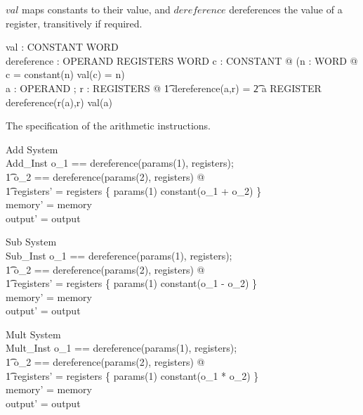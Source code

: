 $val$ maps constants to their value, and $dereference$ dereferences
the value of a register, transitively if required.

\begin{axdef}
    val : CONSTANT \fun WORD\\
    dereference : OPERAND \cross REGISTERS \fun WORD
\where
    \forall c : CONSTANT @ (\exists n : WORD @ c = constant(n) \land val(c) = n)\\
    \forall a : OPERAND ; r : REGISTERS @
	\t1 dereference(a,r) =
	    \t2 \IF a \in REGISTER \THEN dereference(r(a),r) \ELSE val(a)
\end{axdef}

The specification of the arithmetic instructions.

\begin{schema}{Add}
    \Delta System\\
    Add\_Inst
\where
    \LET o_1 == dereference(params(1), registers);\\
	\t1 o_2 == dereference(params(2), registers) @\\
        \t1 registers' = registers \oplus 
	    \{ params(1) \mapsto constant(o_1 + o_2) \}\\
    memory' = memory\\
    output' = output
\end{schema}

\begin{schema}{Sub}
    \Delta System\\
    Sub\_Inst
\where
    \LET o_1 == dereference(params(1), registers);\\
	\t1 o_2 == dereference(params(2), registers) @\\
        \t1 registers' = registers \oplus 
	    \{ params(1) \mapsto constant(o_1 - o_2) \}\\
    memory' = memory\\
    output' = output
\end{schema}

\begin{schema}{Mult}
    \Delta System\\
    Mult\_Inst
\where
    \LET o_1 == dereference(params(1), registers);\\
	\t1 o_2 == dereference(params(2), registers) @\\
        \t1 registers' = registers \oplus 
	    \{ params(1) \mapsto constant(o_1 * o_2) \}\\
    memory' = memory\\
    output' = output
\end{schema}

